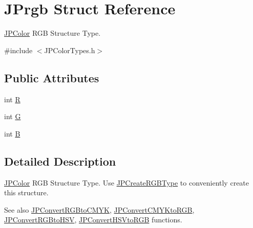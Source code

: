 \hypertarget{struct_j_prgb}{
\section{JPrgb Struct Reference}
\label{struct_j_prgb}
}


\hyperlink{interface_j_p_color}{JPColor} RGB Structure Type.  




{\ttfamily \#include $<$JPColorTypes.h$>$}

\subsection*{Public Attributes}
\begin{DoxyCompactItemize}
\item 
int \hyperlink{struct_j_prgb_a5ce535033f1ffe3f7794c55b60f9b3bb}{R}
\item 
int \hyperlink{struct_j_prgb_a3f582322eda3a73be76422ae424f0aa2}{G}
\item 
int \hyperlink{struct_j_prgb_ae61c8a38e86f875de52e51f5b1326379}{B}
\end{DoxyCompactItemize}


\subsection{Detailed Description}
\hyperlink{interface_j_p_color}{JPColor} RGB Structure Type. Use \hyperlink{_j_p_color_functions_8h_a1eda119ff0f5566f886a81a784c67388}{JPCreateRGBType} to conveniently create this structure. \begin{DoxySeeAlso}{See also}
\hyperlink{_j_p_color_convert_functions_8h_a8c9831bc0a46f817ca27293ee2c3136d}{JPConvertRGBtoCMYK}, \hyperlink{_j_p_color_convert_functions_8h_afbace75877e5f8a1e13cd3cd6862d5dc}{JPConvertCMYKtoRGB}, \hyperlink{_j_p_color_convert_functions_8h_ab9d9002d48aff333c31d3b5c30512648}{JPConvertRGBtoHSV}, \hyperlink{_j_p_color_convert_functions_8h_a5dc60c232611ea3801fa48d1b77dc9f7}{JPConvertHSVtoRGB} functions. 
\end{DoxySeeAlso}


